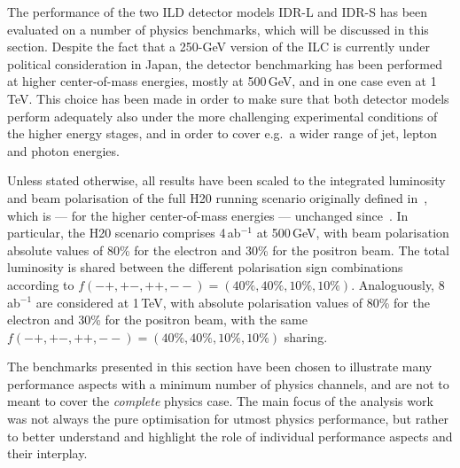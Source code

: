 

The performance of the two ILD detector models IDR-L and IDR-S has been
evaluated on a number of physics benchmarks, which will be discussed in this section. Despite the fact that a 250-GeV version of the ILC is currently under political consideration in Japan, the detector benchmarking has been performed at higher center-of-mass energies, mostly at 500\,GeV, and in one case even at 1\,TeV. This choice has been made in order to make sure that both detector models perform adequately also under the more challenging experimental conditions of the higher energy stages, and in order to cover e.g.\ a wider range of jet, lepton and photon energies.

Unless stated otherwise, all results have been scaled to the integrated luminosity and beam polarisation of the full H20 running scenario originally defined in~\cite{Barklow:2015tja}, which is --- for the higher center-of-mass energies --- unchanged since~\cite{Bambade:2019fyw}. In particular, the H20 scenario comprises 4\,ab$^{-1}$ at 500\,GeV, with beam polarisation absolute values of 80\% for the electron and 30\% for the positron beam. The total luminosity is shared between the different polarisation sign combinations according to $f(-+,+-,++,--) = (40\%,40\%, 10\%, 10\%)$. 
Analoguously, 8\,ab$^{-1}$ are considered at 1\,TeV, with absolute polarisation values of 80\% for the electron and 30\% for the positron beam, with the same $f(-+,+-,++,--) = (40\%,40\%, 10\%, 10\%)$ sharing.

The benchmarks presented in this section have been chosen to illustrate many performance aspects with a minimum number of physics channels, and are not to meant to cover the {\em complete} physics case. The main focus of the analysis work was not always the pure optimisation for utmost physics performance, but rather to better understand and highlight the role of individual performance aspects and their interplay.

